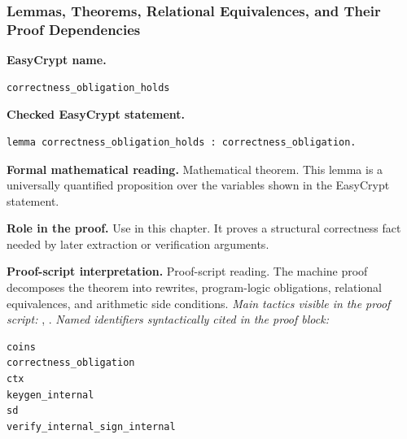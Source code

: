 \subsubsection*{Lemmas, Theorems, Relational Equivalences, and Their Proof Dependencies}
\begin{formaltheorem}
\noindent\textbf{EasyCrypt name.}
\begin{lstlisting}[language=EasyCrypt,basicstyle=\ttfamily\scriptsize]
correctness_obligation_holds
\end{lstlisting}
\noindent\textbf{Checked EasyCrypt statement.}
\begin{lstlisting}[language=EasyCrypt,basicstyle=\ttfamily\scriptsize]
lemma correctness_obligation_holds : correctness_obligation.
\end{lstlisting}
\noindent\textbf{Formal mathematical reading.}
Mathematical theorem. This lemma is a universally quantified proposition over the variables shown in the EasyCrypt statement.

\noindent\textbf{Role in the proof.}
Use in this chapter. It proves a structural correctness fact needed by later extraction or verification arguments.

\noindent\textbf{Proof-script interpretation.}
Proof-script reading. The machine proof decomposes the theorem into rewrites, program-logic obligations, relational equivalences, and arithmetic side conditions.
\emph{Main tactics visible in the proof script:} , .
\emph{Named identifiers syntactically cited in the proof block:}
\begin{lstlisting}[language=EasyCrypt,basicstyle=\ttfamily\scriptsize]
coins
correctness_obligation
ctx
keygen_internal
sd
verify_internal_sign_internal
\end{lstlisting}

\end{formaltheorem}

